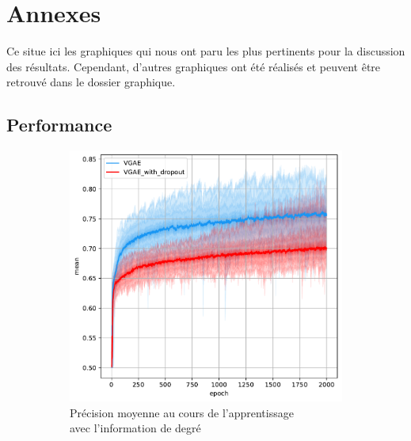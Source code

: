 \documentclass{article}
\begin{document}
\newpage
\section{Annexes}
Ce situe ici les graphiques qui nous ont paru les plus pertinents pour la discussion des résultats. Cependant, d'autres graphiques ont été réalisés et peuvent être retrouvé dans le dossier graphique.
\subsection{Performance}
\begin{figure}[H]
    \centering
    \captionsetup{justification=centering}
    \begin{subfigure}{0.45\textwidth}
      \includegraphics[width=\textwidth]{graphics/APs_degree_dropout_cinf.svg.pdf}
      \centering
      \caption{Précision moyenne au cours de l'apprentissage\\ avec l'information de degré}
    \end{subfigure}
    \begin{subfigure}{0.45\textwidth}

\end{subfigure}
\end{figure}
\end{document}
